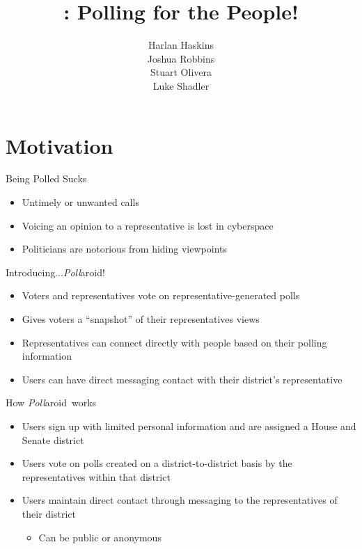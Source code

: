 \documentclass[11pt,aps,prb,groupedaddress,nofootinbib,floatfix]{beamer}
\author{Harlan Haskins\\Joshua Robbins\\Stuart Olivera\\Luke Shadler}
\title{\pollaroid : Polling for the People!}
\institute{Rochester Institute of Technology}
\newcommand{\pollaroid}{\emph{Poll}aroid}
\begin{document}
\begin{frame}
\titlepage
\end{frame}


\section{Motivation}


%
%
\begin{frame}{Being Polled Sucks}
\begin{itemize}
	\item Untimely or unwanted calls
	\item Voicing an opinion to a representative is lost in cyberspace
	\item Politicians are notorious from hiding viewpoints
\end{itemize}
\end{frame}

%
%
\begin{frame}{Introducing...\pollaroid!}
\begin{itemize}
	\item Voters and representatives vote on representative-generated polls
	\item Gives voters a ``snapshot'' of their representatives views
	\item Representatives can connect directly with people based on their polling information
	\item Users can have direct messaging contact with their district's representative
\end{itemize}
\end{frame}

%
%
\begin{frame}{How \pollaroid\  works}
\begin{itemize}
	\item Users sign up with limited personal information and are assigned a House and Senate district
	\item Users vote on polls created on a district-to-district basis by the representatives within that district
	\item Users maintain direct contact through messaging to the representatives of their district
	\begin{itemize}
		\item Can be public or anonymous
	\end{itemize}
\end{itemize}
\end{frame}
\end{document}
